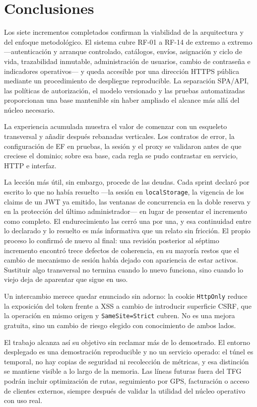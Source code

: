 \chapter{Conclusiones}

Los siete incrementos completados confirman la viabilidad de la arquitectura y del enfoque metodológico. El sistema cubre RF-01 a RF-14 de extremo a extremo ---autenticación y arranque controlado, catálogos, envíos, asignación y ciclo de vida, trazabilidad inmutable, administración de usuarios, cambio de contraseña e indicadores operativos--- y queda accesible por una dirección HTTPS pública mediante un procedimiento de despliegue reproducible. La separación SPA/API, las políticas de autorización, el modelo versionado y las pruebas automatizadas proporcionan una base mantenible sin haber ampliado el alcance más allá del núcleo necesario.

La experiencia acumulada muestra el valor de comenzar con un esqueleto transversal y añadir después rebanadas verticales. Los contratos de error, la configuración de EF en pruebas, la sesión y el proxy se validaron antes de que creciese el dominio; sobre esa base, cada regla se pudo contrastar en servicio, HTTP e interfaz.

La lección más útil, sin embargo, procede de las deudas. Cada sprint declaró por escrito lo que no había resuelto ---la sesión en \texttt{localStorage}, la vigencia de los claims de un JWT ya emitido, las ventanas de concurrencia en la doble reserva y en la protección del último administrador--- en lugar de presentar el incremento como completo. El endurecimiento las cerró una por una, y esa continuidad entre lo declarado y lo resuelto es más informativa que un relato sin fricción. El propio proceso lo confirmó de nuevo al final: una revisión posterior al séptimo incremento encontró trece defectos de coherencia, en su mayoría restos que el cambio de mecanismo de sesión había dejado con apariencia de estar activos. Sustituir algo transversal no termina cuando lo nuevo funciona, sino cuando lo viejo deja de aparentar que sigue en uso.

Un intercambio merece quedar enunciado sin adorno: la cookie \texttt{HttpOnly} reduce la exposición del token frente a XSS a cambio de introducir superficie CSRF, que la operación en mismo origen y \texttt{SameSite=Strict} cubren. No es una mejora gratuita, sino un cambio de riesgo elegido con conocimiento de ambos lados.

El trabajo alcanza así su objetivo sin reclamar más de lo demostrado. El entorno desplegado es una demostración reproducible y no un servicio operado: el túnel es temporal, no hay copias de seguridad ni recolección de métricas, y esa distinción se mantiene visible a lo largo de la memoria. Las líneas futuras fuera del TFG podrán incluir optimización de rutas, seguimiento por GPS, facturación o acceso de clientes externos, siempre después de validar la utilidad del núcleo operativo con uso real.
